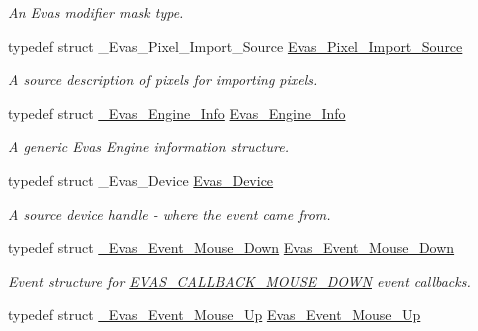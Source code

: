 \begin{DoxyCompactItemize}
\begin{DoxyCompactList}\small\item\em An Evas modifier mask type. \item\end{DoxyCompactList}\item 
typedef struct \_\-Evas\_\-Pixel\_\-Import\_\-Source \hyperlink{Evas_8h_abb01076af16fbb50a837b1893b776783}{Evas\_\-Pixel\_\-Import\_\-Source}\label{Evas_8h_abb01076af16fbb50a837b1893b776783}

\begin{DoxyCompactList}\small\item\em A source description of pixels for importing pixels. \item\end{DoxyCompactList}\item 
typedef struct \hyperlink{struct__Evas__Engine__Info}{\_\-Evas\_\-Engine\_\-Info} \hyperlink{Evas_8h_a86d67b69014ab10fffe20b883685fa46}{Evas\_\-Engine\_\-Info}\label{Evas_8h_a86d67b69014ab10fffe20b883685fa46}

\begin{DoxyCompactList}\small\item\em A generic Evas Engine information structure. \item\end{DoxyCompactList}\item 
typedef struct \_\-Evas\_\-Device \hyperlink{Evas_8h_a430c2d9c773093d159437e35003df281}{Evas\_\-Device}\label{Evas_8h_a430c2d9c773093d159437e35003df281}

\begin{DoxyCompactList}\small\item\em A source device handle -\/ where the event came from. \item\end{DoxyCompactList}\item 
typedef struct \hyperlink{struct__Evas__Event__Mouse__Down}{\_\-Evas\_\-Event\_\-Mouse\_\-Down} \hyperlink{Evas_8h_a907df7a46177e7bac9928ea39fbcca50}{Evas\_\-Event\_\-Mouse\_\-Down}\label{Evas_8h_a907df7a46177e7bac9928ea39fbcca50}

\begin{DoxyCompactList}\small\item\em Event structure for \hyperlink{Evas_8h_a99e208e463a20499aabe6faac8a8cb8aa9fa52651ccf7e47cd3b7785fc4cf393f}{EVAS\_\-CALLBACK\_\-MOUSE\_\-DOWN} event callbacks. \item\end{DoxyCompactList}\item 
typedef struct \hyperlink{struct__Evas__Event__Mouse__Up}{\_\-Evas\_\-Event\_\-Mouse\_\-Up} \hyperlink{Evas_8h_a337e8227780d38bdeae5c0ccd00d04b3}{Evas\_\-Event\_\-Mouse\_\-Up}\label{Evas_8h_a337e8227780d38bdeae5c0ccd00d04b3}


\end{DoxyCompactItemize}
